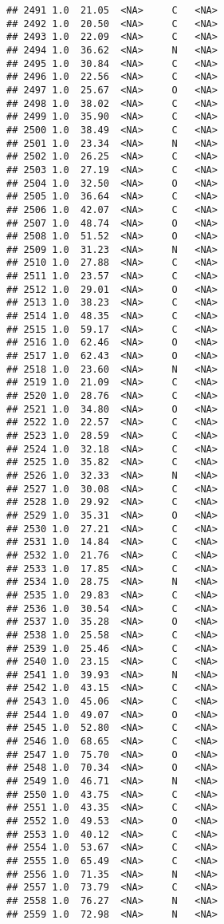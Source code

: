 \documentclass[
]{article}
\begin{document}
\begin{verbatim}
## 2491 1.0  21.05  <NA>     C   <NA>
## 2492 1.0  20.50  <NA>     C   <NA>
## 2493 1.0  22.09  <NA>     C   <NA>
## 2494 1.0  36.62  <NA>     N   <NA>
## 2495 1.0  30.84  <NA>     C   <NA>
## 2496 1.0  22.56  <NA>     C   <NA>
## 2497 1.0  25.67  <NA>     O   <NA>
## 2498 1.0  38.02  <NA>     C   <NA>
## 2499 1.0  35.90  <NA>     C   <NA>
## 2500 1.0  38.49  <NA>     C   <NA>
## 2501 1.0  23.34  <NA>     N   <NA>
## 2502 1.0  26.25  <NA>     C   <NA>
## 2503 1.0  27.19  <NA>     C   <NA>
## 2504 1.0  32.50  <NA>     O   <NA>
## 2505 1.0  36.64  <NA>     C   <NA>
## 2506 1.0  42.07  <NA>     C   <NA>
## 2507 1.0  48.74  <NA>     O   <NA>
## 2508 1.0  51.52  <NA>     O   <NA>
## 2509 1.0  31.23  <NA>     N   <NA>
## 2510 1.0  27.88  <NA>     C   <NA>
## 2511 1.0  23.57  <NA>     C   <NA>
## 2512 1.0  29.01  <NA>     O   <NA>
## 2513 1.0  38.23  <NA>     C   <NA>
## 2514 1.0  48.35  <NA>     C   <NA>
## 2515 1.0  59.17  <NA>     C   <NA>
## 2516 1.0  62.46  <NA>     O   <NA>
## 2517 1.0  62.43  <NA>     O   <NA>
## 2518 1.0  23.60  <NA>     N   <NA>
## 2519 1.0  21.09  <NA>     C   <NA>
## 2520 1.0  28.76  <NA>     C   <NA>
## 2521 1.0  34.80  <NA>     O   <NA>
## 2522 1.0  22.57  <NA>     C   <NA>
## 2523 1.0  28.59  <NA>     C   <NA>
## 2524 1.0  32.18  <NA>     C   <NA>
## 2525 1.0  35.82  <NA>     C   <NA>
## 2526 1.0  32.33  <NA>     N   <NA>
## 2527 1.0  30.08  <NA>     C   <NA>
## 2528 1.0  29.92  <NA>     C   <NA>
## 2529 1.0  35.31  <NA>     O   <NA>
## 2530 1.0  27.21  <NA>     C   <NA>
## 2531 1.0  14.84  <NA>     C   <NA>
## 2532 1.0  21.76  <NA>     C   <NA>
## 2533 1.0  17.85  <NA>     C   <NA>
## 2534 1.0  28.75  <NA>     N   <NA>
## 2535 1.0  29.83  <NA>     C   <NA>
## 2536 1.0  30.54  <NA>     C   <NA>
## 2537 1.0  35.28  <NA>     O   <NA>
## 2538 1.0  25.58  <NA>     C   <NA>
## 2539 1.0  25.46  <NA>     C   <NA>
## 2540 1.0  23.15  <NA>     C   <NA>
## 2541 1.0  39.93  <NA>     N   <NA>
## 2542 1.0  43.15  <NA>     C   <NA>
## 2543 1.0  45.06  <NA>     C   <NA>
## 2544 1.0  49.07  <NA>     O   <NA>
## 2545 1.0  52.80  <NA>     C   <NA>
## 2546 1.0  68.65  <NA>     C   <NA>
## 2547 1.0  75.70  <NA>     O   <NA>
## 2548 1.0  70.34  <NA>     O   <NA>
## 2549 1.0  46.71  <NA>     N   <NA>
## 2550 1.0  43.75  <NA>     C   <NA>
## 2551 1.0  43.35  <NA>     C   <NA>
## 2552 1.0  49.53  <NA>     O   <NA>
## 2553 1.0  40.12  <NA>     C   <NA>
## 2554 1.0  53.67  <NA>     C   <NA>
## 2555 1.0  65.49  <NA>     C   <NA>
## 2556 1.0  71.35  <NA>     N   <NA>
## 2557 1.0  73.79  <NA>     C   <NA>
## 2558 1.0  76.27  <NA>     N   <NA>
## 2559 1.0  72.98  <NA>     N   <NA>

\end{verbatim}
\end{document}
